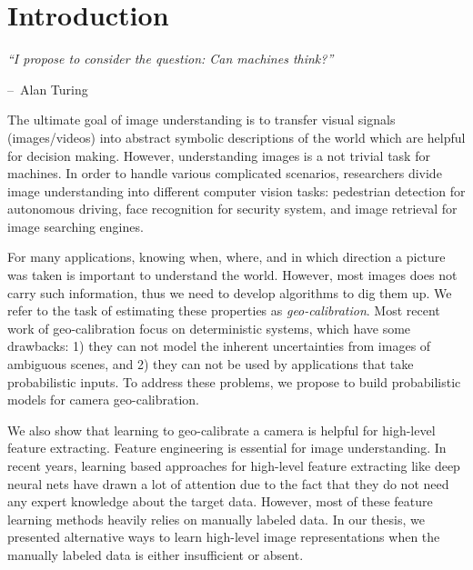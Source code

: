 \chapter{Introduction}
\label{chap:intro}

\makeatletter
\newenvironment{chapquote}[2][2em]
{\setlength{\@tempdima}{#1} \def\chapquote@author{#2} \parshape 1
  \@tempdima \dimexpr\textwidth-2\@tempdima\relax \itshape}
{\par\normalfont\hfill--\
\chapquote@author\hspace*{\@tempdima}\par\bigskip}
\makeatother

\begin{chapquote}{Alan Turing}
  ``I propose to consider the question: Can machines think?''
\end{chapquote}
The ultimate goal of image understanding is to transfer visual
signals (images/videos) into abstract symbolic descriptions of the
world which are helpful for decision making.
However, understanding images is a not trivial task for machines.
In order to handle various complicated scenarios, researchers divide
image understanding into different computer vision tasks: pedestrian
detection for autonomous driving, face recognition for security
system, and image retrieval for image searching engines.

For many applications, knowing when, where, and in which direction a
picture was taken is important to understand the world. However, most
images does not carry such information, thus we need to develop
algorithms to dig them up.  We refer to the task of estimating these
properties as {\em geo-calibration}.
Most recent work of geo-calibration focus on deterministic systems, 
which have some drawbacks: 1) they can not model the inherent
uncertainties from images of ambiguous scenes, and 2) they can not be
used by applications that take probabilistic inputs. To address
these problems, we propose to build probabilistic models for camera
geo-calibration.

We also show that learning to geo-calibrate a camera is helpful for
high-level feature extracting. Feature engineering is essential for
image understanding. In recent years, learning based approaches for
high-level feature extracting like deep neural nets have drawn a lot
of attention due to the fact that they do not need any expert
knowledge about the target data. However, most of these feature
learning methods heavily relies on manually labeled data. In our
thesis, we presented alternative ways to learn high-level image
representations when the manually labeled data is either insufficient
or absent.

